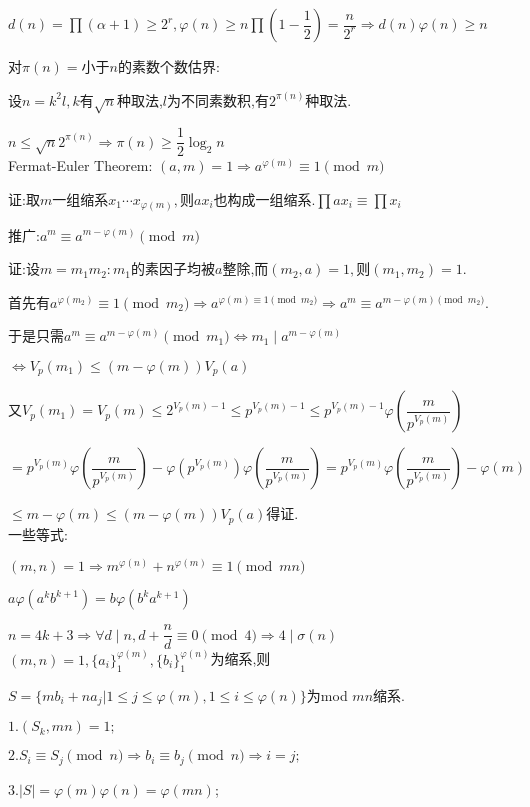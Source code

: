 $ d(n)=\prod{(\alpha+1)}\ge 2^r,\varphi(n)\ge n \prod{(1-\dfrac{1}{2})}=\dfrac{n}{2^r}\Rightarrow d(n)\varphi(n)\ge n$

对$ \pi(n)=$小于$ n$的素数个数估界: 

设$ n=k^2l,k$有$ \sqrt{n}$种取法,$ l$为不同素数积,有$ 2^{\pi(n)}$种取法.

$ n\le \sqrt{n}2^{\pi(n)}\Rightarrow \pi(n)\ge \dfrac{1}{2}\log_2n$
\\

Fermat-Euler Theorem:
$ (a,m)=1\Rightarrow a^{\varphi(m)}\equiv 1 \pmod m$

证:取$ m$一组缩系$ x_1\cdots x_{\varphi(m)},$则$ ax_i$也构成一组缩系.$ \prod{ax_i}\equiv \prod{x_i}$

推广:$ a^m \equiv a^{m-\varphi(m)} \pmod m$

证:设$ m=m_1m_2:m_1$的素因子均被$ a$整除,而$ (m_2,a)=1,$则$ (m_1,m_2)=1$.

首先有$ a^{\varphi(m_2)}\equiv 1 \pmod{m_2}\Rightarrow a^{\varphi(m)\equiv 1 \pmod{m_2}}\Rightarrow a^m\equiv a^{m-\varphi(m)\pmod{m_2}}$.

于是只需$ a^m\equiv a^{m-\varphi(m)}\pmod{m_1}\Leftrightarrow m_1\mid a^{m-\varphi(m)}$ 

$\Leftrightarrow V_p(m_1)\le (m-\varphi(m))V_p(a)$

又$ V_p(m_1)=V_p(m)\le2^{V_p(m)-1}\le p^{V_p(m)-1}\le p^{V_p(m)-1}\varphi(\dfrac{m}{p^{V_p(m)}})$ 

$=p^{V_p(m)}\varphi(\dfrac{m}{p^{V_p(m)}})-\varphi(p^{V_p(m)})\varphi(\dfrac{m}{p^{V_p(m)}})=p^{V_p(m)}\varphi(\dfrac{m}{p^{V_p(m)}})-\varphi(m)$ 

$\le m-\varphi(m)\le (m-\varphi(m))V_p(a)$得证.
\\

一些等式:

$ (m,n)=1\Rightarrow m^{\varphi(n)}+n^{\varphi(m)}\equiv 1 \pmod{mn}$

$ a\varphi(a^kb^{k+1})=b\varphi(b^ka^{k+1})$

$n=4k+3 \Rightarrow \forall d \mid n ,d+\dfrac{n}{d}\equiv 0 \pmod 4\Rightarrow 4 \mid \sigma(n)$
\\

$ (m,n)=1,\{ a_i\}_{1}^{\varphi(m)},\{ b_i\}_1^{\varphi(n)}$为缩系,则

$ S=\{ mb_i+na_j | 1\le j\le \varphi(m),1\le i \le \varphi(n)\}$为mod $ mn$缩系.

$ 1.(S_k,mn)=1; $ 

$ 2.S_i\equiv S_j \pmod n\Rightarrow b_i\equiv b_j \pmod n\Rightarrow i=j;$ 

$ 3.|S|=\varphi(m)\varphi(n)=\varphi(mn)$;
